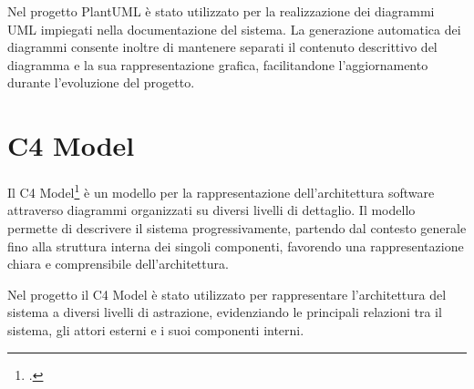 Nel progetto PlantUML è stato utilizzato per la realizzazione dei diagrammi
UML impiegati nella documentazione del sistema.
La generazione automatica dei diagrammi consente inoltre di mantenere
separati il contenuto descrittivo del diagramma e la sua rappresentazione
grafica, facilitandone l'aggiornamento durante l'evoluzione del progetto.

\section{C4 Model}

Il C4 Model\footcite{site:c4model} è un modello per la rappresentazione
dell'architettura software attraverso diagrammi organizzati su diversi
livelli di dettaglio. Il modello permette di descrivere il sistema
progressivamente, partendo dal contesto generale fino alla struttura
interna dei singoli componenti, favorendo una rappresentazione chiara
e comprensibile dell'architettura.

Nel progetto il C4 Model è stato utilizzato per rappresentare
l'architettura del sistema a diversi livelli di astrazione, evidenziando
le principali relazioni tra il sistema, gli attori esterni e i suoi
componenti interni.

\newpage